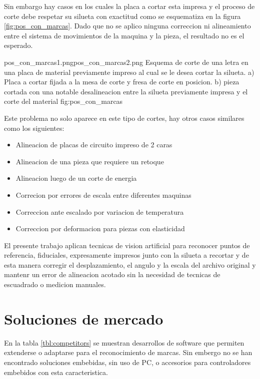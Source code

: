          Sin embargo hay casos en los cuales la placa a cortar esta impresa y el proceso de corte debe respetar su silueta con exactitud como se esquematiza en la figura \ref{fig:pos_con_marcas}.
         Dado que no se aplico ninguna correccion ni alineamiento entre el sistema de movimientos de la maquina y la pieza, el resultado no es el esperado.

         {pos_con_marcas1.png}{pos_con_marcas2.png}
         {Esquema de corte de una letra en una placa de material previamente impreso al cual se le desea cortar la silueta. a) Placa a cortar fijada a la mesa de corte y fresa de corte en posicion. b) pieza cortada con una notable desalineacion entre la silueta previamente impresa y el corte del material}
         {fig:pos_con_marcas}

         Este problema no solo aparece en este tipo de cortes, hay otros casos similares como los siguientes:
\begin{itemize}
   \item{Alineacion de placas de circuito impreso de 2 caras}
   \item{Alineacion de una pieza que requiere un retoque}
   \item{Alineacion luego de un corte de energia}
   \item{Correcion por errores de escala entre diferentes maquinas}
   \item{Correccion ante escalado por variacion de temperatura}
   \item{Correccion por deformacion para piezas con elasticidad}
\end{itemize}

         El presente trabajo aplican tecnicas de vision artificial para reconocer puntos de referencia, fiduciales, expresamente impresos junto con la silueta a recortar y de esta manera corregir el desplazamiento, el angulo y la escala del archivo original y mantenr un error de alineacion acotado sin la necesidad de tecnicas de escuadrado o medicion manuales.


\section{Soluciones de mercado}

En la tabla \ref{tbl:competitors} se muestran desarrollos de software que permiten extenderse o adaptarse para el reconocimiento de marcas. Sin embergo no se han encontrado soluciones embebidas, sin uso de PC, o accesorios para controladores embebidos con esta caracteristica.
   
